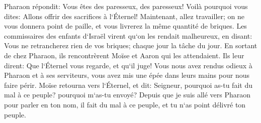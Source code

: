 \verse Pharaon répondit: Vous êtes des paresseux, des paresseux! Voilà pourquoi vous dites: Allons offrir des sacrifices à l`Éternel! 
\verse Maintenant, allez travailler; on ne vous donnera point de paille, et vous livrerez la même quantité de briques. 
\verse Les commissaires des enfants d`Israël virent qu`on les rendait malheureux, en disant: Vous ne retrancherez rien de vos briques; chaque jour la tâche du jour. 
\verse En sortant de chez Pharaon, ils rencontrèrent Moïse et Aaron qui les attendaient. 
\verse Ils leur dirent: Que l`Éternel vous regarde, et qu`il juge! Vous nous avez rendus odieux à Pharaon et à ses serviteurs, vous avez mis une épée dans leurs mains pour nous faire périr. 
\verse Moïse retourna vers l`Éternel, et dit: Seigneur, pourquoi as-tu fait du mal à ce peuple? pourquoi m`as-tu envoyé? 
\verse Depuis que je suis allé vers Pharaon pour parler en ton nom, il fait du mal à ce peuple, et tu n`as point délivré ton peuple. 

